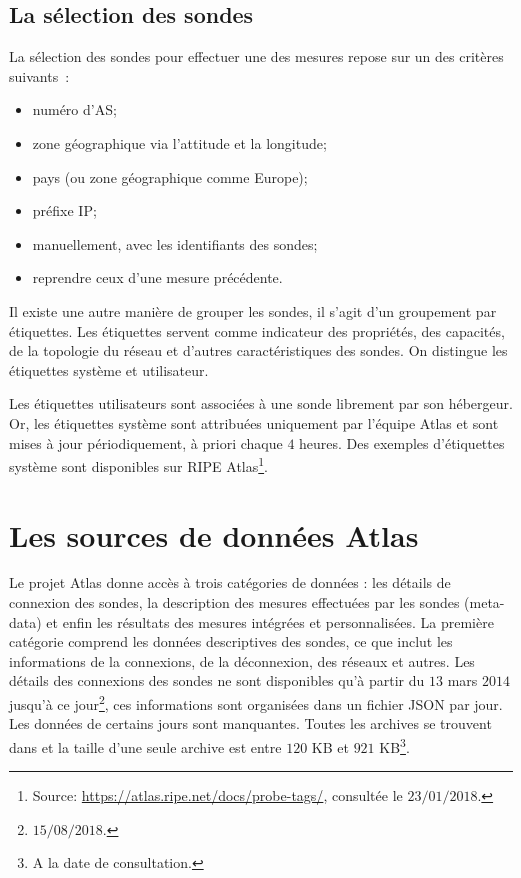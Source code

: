 \subsection{La sélection des sondes}
La sélection des sondes   pour effectuer une des mesures repose sur un des critères suivants~: 
\begin{itemize}
	\item numéro d'AS;
	\item zone géographique via  l'attitude et la longitude;
	\item pays (ou zone géographique comme  Europe);
	\item préfixe IP; %
	\item manuellement, avec les identifiants des sondes;
	\item reprendre ceux d'une  mesure précédente.
\end{itemize}

Il existe une autre manière de grouper les sondes, il s'agit d'un groupement  par étiquettes.  Les étiquettes servent comme indicateur des propriétés, des capacités, de la topologie du réseau et d'autres caractéristiques des sondes. On distingue les étiquettes système  et utilisateur. %

Les étiquettes utilisateurs sont  associées à une sonde librement par son hébergeur. Or, les étiquettes système sont attribuées uniquement par l'équipe  Atlas et sont mises à jour périodiquement, à priori chaque $4$ heures. Des exemples d'étiquettes système sont disponibles sur RIPE Atlas\footnote{Source: \url{https://atlas.ripe.net/docs/probe-tags/}, consultée le $23/01/2018$.}.

\section{Les sources de données Atlas} \label{subsec:sources-data}

Le projet Atlas donne accès à trois catégories de données : les détails de connexion des sondes, la description des mesures effectuées par les sondes (meta-data) et enfin
les résultats des mesures intégrées et personnalisées.
La première catégorie comprend  les données descriptives des  sondes, ce que inclut
les informations de la connexions, de la déconnexion, des réseaux et autres. Les détails des connexions des sondes ne sont disponibles qu'à partir du  $13$ mars $2014$ jusqu'à ce jour\footnote{$15/08/2018$.}, ces informations sont organisées dans un fichier JSON par jour.
Les données de certains jours sont manquantes.  Toutes les archives se trouvent dans \cite{probes-data} et la taille d'une seule archive est entre $120 $ KB et $921$ KB\footnote{A la date de consultation.}. 

